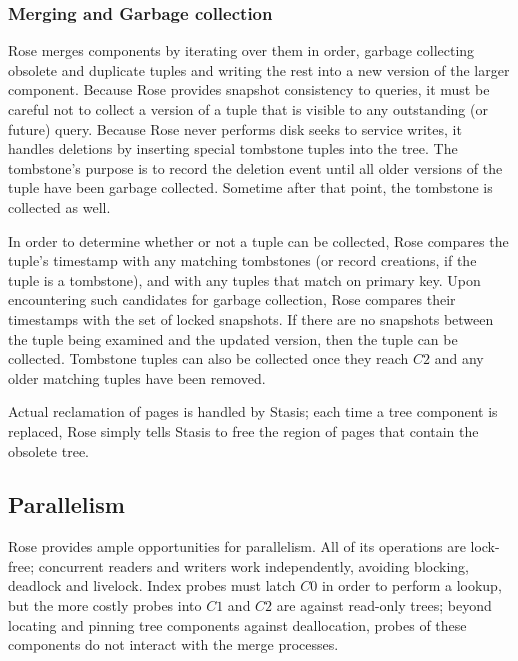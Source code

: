 \documentclass{vldb}
\newcommand{\rows}{Rose\xspace}
\begin{document}
\subsubsection{Merging and Garbage collection}

\rows merges components by iterating over them in order, garbage collecting
obsolete and duplicate tuples and writing the rest into a new version
of the larger component.  Because \rows provides snapshot consistency
to queries, it must be careful not to collect a version of a tuple that
is visible to any outstanding (or future) query.  Because \rows
never performs disk seeks to service writes, it handles deletions by
inserting special tombstone tuples into the tree.  The tombstone's
purpose is to record the deletion event until all older versions of
the tuple have been garbage collected.  Sometime after that point, the tombstone
is collected as well.

In order to determine whether or not a tuple can be collected, \rows
compares the tuple's timestamp with any matching tombstones (or record
creations, if the tuple is a tombstone), and with any tuples that
match on primary key.  Upon encountering such candidates for garbage collection,
\rows compares their timestamps with the set of locked snapshots.  If
there are no snapshots between the tuple being examined and the
updated version, then the tuple can be collected.  Tombstone tuples can
also be collected once they reach $C2$ and any older matching tuples
have been removed.

Actual reclamation of pages is handled by Stasis; each time a tree
component is replaced, \rows simply tells Stasis to free the region of
pages that contain the obsolete tree.


\subsection{Parallelism}

\rows provides ample opportunities for parallelism.  All of its
operations are lock-free; concurrent readers and writers work
independently, avoiding blocking, deadlock and livelock.  Index probes
must latch $C0$ in order to perform a lookup, but the more costly
probes into $C1$ and $C2$ are against read-only trees; beyond locating
and pinning tree components against deallocation, probes of these
components do not interact with the merge processes.
\end{document}
